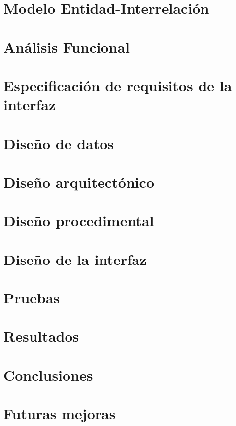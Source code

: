 \documentclass[a4paper,12pt,draft]{book}
\begin{document}
   \chapter{Modelo Entidad-Interrelación}

   \chapter{Análisis Funcional}

   \chapter{Especificación de requisitos de la interfaz}

   \chapter{Diseño de datos}

   \chapter{Diseño arquitectónico}

   \chapter{Diseño procedimental}

   \chapter{Diseño de la interfaz}

   \chapter{Pruebas}

   \chapter{Resultados}

   \chapter{Conclusiones}

   \chapter{Futuras mejoras}
\end{document}
